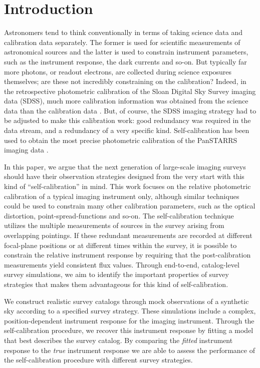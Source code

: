 \documentclass[preprint,pdftex]{aastex}
\begin{document}


\section{Introduction}
Astronomers tend to think conventionally in terms of taking science data and calibration data separately. The former is used for scientific measurements of astronomical sources and the latter is used to constrain instrument parameters, such as the instrument response, the dark currents and so-on. But typically far more photons, or readout electrons, are collected during science exposures themselves; are these not incredibly constraining on the calibration? Indeed, in the retrospective photometric calibration of the Sloan Digital Sky Survey imaging data (SDSS), much more calibration information was obtained from the science data than the calibration data \citep{pad08}. But, of course, the SDSS imaging strategy had to be adjusted to make this calibration work: good redundancy was required in the data stream, and a redundancy of a very specific kind. Self-calibration has been used to obtain the most precise photometric calibration of the PanSTARRS imaging data \citep{sch12}.

In this paper, we argue that the next generation of large-scale imaging surveys should have their observation strategies designed from the very start with this kind of ``self-calibration'' in mind. This work focuses on the relative photometric calibration of a typical imaging instrument only, although similar techniques could be used to constrain many other calibration parameters, such as the optical distortion, point-spread-functions and so-on. The self-calibration technique utilizes the multiple measurements of sources in the survey arising from overlapping pointings. If these redundant measurements are recorded at different focal-plane positions or at different times within the survey, it is possible to constrain the relative instrument response by requiring that the post-calibration measurements yield consistent flux values. Through end-to-end, catalog-level survey simulations, we aim to identify the important properties of survey strategies that makes them advantageous for this kind of self-calibration. 

We construct realistic survey catalogs through mock observations of a synthetic sky according to a specified survey strategy. These simulations include a complex, position-dependent instrument response for the imaging instrument. Through the self-calibration procedure, we recover this instrument response by fitting a model that best describes the survey catalog. By comparing the \textit{fitted} instrument response to the \textit{true} instrument response we are able to assess the performance of the self-calibration procedure with different survey strategies. 
\end{document}
